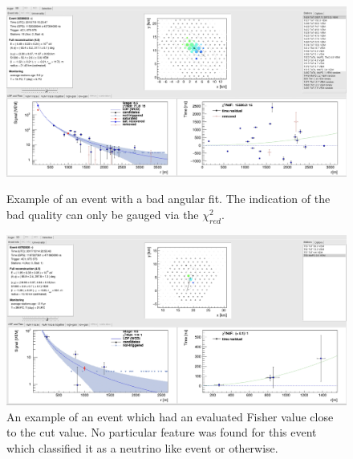 \begin{figure}[h!]
  \centering
  \includegraphics[width=\textwidth]{thesis_figures/App3/bad_ang_fit.png}
  \caption{Example of an event with a bad angular fit. The indication of the bad quality can only be gauged via the $\chi^2_{red}$.}
  \label{fig:bad_ang_fit}
  \includegraphics[width=\textwidth]{thesis_figures/App3/Bkg_close_noproblem.png}
  \caption{An example of an event which had an evaluated Fisher value close to the cut value. No particular feature was found for this event which classified it as a neutrino like event or otherwise.} 
  \label{fig:bad_fisher}

\end{figure}
